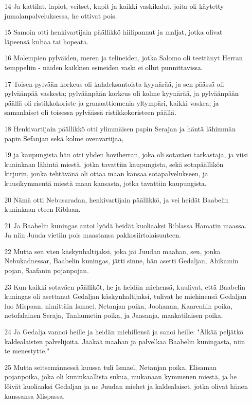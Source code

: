\par 14 Ja kattilat, lapiot, veitset, kupit ja kaikki vaskikalut, joita oli käytetty jumalanpalveluksessa, he ottivat pois.
\par 15 Samoin otti henkivartijain päällikkö hiilipannut ja maljat, jotka olivat läpeensä kultaa tai hopeata.
\par 16 Molempien pylväiden, meren ja telineiden, jotka Salomo oli teettänyt Herran temppeliin - näiden kaikkien esineiden vaski ei ollut punnittavissa.
\par 17 Toisen pylvään korkeus oli kahdeksantoista kyynärää, ja sen päässä oli pylväänpää vaskesta; pylväänpään korkeus oli kolme kyynärää, ja pylväänpään päällä oli ristikkokoriste ja granaattiomenia yltympäri, kaikki vaskea; ja samanlaiset oli toisessa pylväässä ristikkokoristeen päällä.
\par 18 Henkivartijain päällikkö otti ylimmäisen papin Serajan ja häntä lähimmän papin Sefanjan sekä kolme ovenvartijaa,
\par 19 ja kaupungista hän otti yhden hoviherran, joka oli sotaväen tarkastaja, ja viisi kuninkaan lähintä miestä, jotka tavattiin kaupungista, sekä sotapäällikön kirjurin, jonka tehtävänä oli ottaa maan kansaa sotapalvelukseen, ja kuusikymmentä miestä maan kansasta, jotka tavattiin kaupungista.
\par 20 Nämä otti Nebusaradan, henkivartijain päällikkö, ja vei heidät Baabelin kuninkaan eteen Riblaan.
\par 21 Ja Baabelin kuningas antoi lyödä heidät kuoliaaksi Riblassa Hamatin maassa. Ja niin Juuda vietiin pois maastansa pakkosiirtolaisuuteen.
\par 22 Mutta sen väen käskynhaltijaksi, joka jäi Juudan maahan, sen, jonka Nebukadnessar, Baabelin kuningas, jätti sinne, hän asetti Gedaljan, Ahikamin pojan, Saafanin pojanpojan.
\par 23 Kun kaikki sotaväen päälliköt, he ja heidän miehensä, kuulivat, että Baabelin kuningas oli asettanut Gedaljan käskynhaltijaksi, tulivat he miehinensä Gedaljan luo Mispaan, nimittäin Ismael, Netanjan poika, Joohanan, Kaareahin poika, netofalainen Seraja, Tanhumetin poika, ja Jaasanja, maakatilaisen poika.
\par 24 Ja Gedalja vannoi heille ja heidän miehillensä ja sanoi heille: "Älkää peljätkö kaldealaisten palvelijoita. Jääkää maahan ja palvelkaa Baabelin kuningasta, niin te menestytte."
\par 25 Mutta seitsemännessä kuussa tuli Ismael, Netanjan poika, Elisaman pojanpoika, joka oli kuninkaallista sukua, mukanaan kymmenen miestä, ja he löivät kuoliaaksi Gedaljan ja ne Juudan miehet ja kaldealaiset, jotka olivat hänen kanssansa Mispassa.

